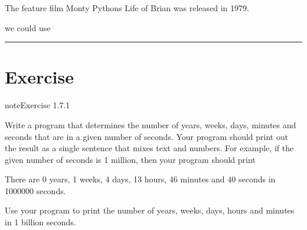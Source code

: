 \documentclass[letterpaper,10pt,english]{jupyterBook}
\begin{document}
\begin{sphinxVerbatim}[commandchars=\\\{\}]
The feature film \PYGZdq{}Monty Python\PYGZsq{}s Life of Brian\PYGZdq{} was released in 1979.
\end{sphinxVerbatim}

\sphinxAtStartPar
we could use

\begin{sphinxVerbatim}[commandchars=\\\{\}]
\end{sphinxVerbatim}


\bigskip\hrule\bigskip



\part{Exercise}
\label{\detokenize{_pages/1.6_Printing_output:exercise}} \label{exercise:python-printing-ex}

\begin{sphinxadmonition}{note}{Exercise 1.7.1}



\sphinxAtStartPar
Write a program that determines the number of years, weeks, days, minutes and seconds that are in a given number of seconds. Your program should print out the result as a single sentence that mixes text and numbers. For example, if the given number of seconds is 1 million, then your program should print

\begin{sphinxVerbatim}[commandchars=\\\{\}]
There are 0 years, 1 weeks, 4 days, 13 hours, 46 minutes and 40 seconds in 1000000 seconds.
\end{sphinxVerbatim}

\sphinxAtStartPar
Use your program to print the number of years, weeks, days, hours and minutes in 1 billion seconds.
\end{sphinxadmonition}







\renewcommand{\indexname}{Index}
\printindex
\end{document}
